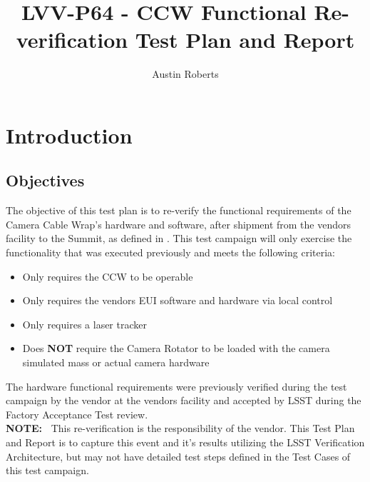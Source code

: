 \documentclass[SE,lsstdraft,STR,toc]{lsstdoc}
\providecommand{\tightlist}{
  \setlength{\itemsep}{0pt}\setlength{\parskip}{0pt}}
\begin{document}
\def\milestoneName{CCW Functional Re-verification}
\def\milestoneId{LVV-P64}
\def\product{SIT-COM Integration}


\title{LVV-P64 - CCW Functional Re-verification Test Plan and Report}
\setDocRef{\lsstDocType-\lsstDocNum}
\date{\vcsdate}
\author{ Austin Roberts }






\maketitle

\section{Introduction}
\label{sect:intro}


\subsection{Objectives}
\label{sect:objectives}

 The objective of this test plan is to re-verify the functional
requirements of the Camera Cable Wrap's hardware and software, after
shipment from the vendors facility to the Summit, as defined in .
This test campaign will only exercise the functionality that was
executed previously and meets the following criteria:

\begin{itemize}
\tightlist
\item
  Only requires the CCW to be operable
\item
  Only requires the vendors EUI software and hardware via local control
\item
  Only requires a laser tracker
\item
  Does \textbf{NOT} require the Camera Rotator to be loaded with the
  camera simulated mass or actual camera hardware
\end{itemize}

The hardware functional requirements were previously verified during the
test campaign by the vendor at the vendors facility and accepted by LSST
during the Factory Acceptance Test
review.\\[2\baselineskip]\textbf{NOTE:~} This re-verification is the
responsibility of the vendor. This Test Plan and Report is to capture
this event and it's results utilizing the LSST Verification
Architecture, but may not have detailed test steps defined in the Test
Cases of this test campaign.
\end{document}
